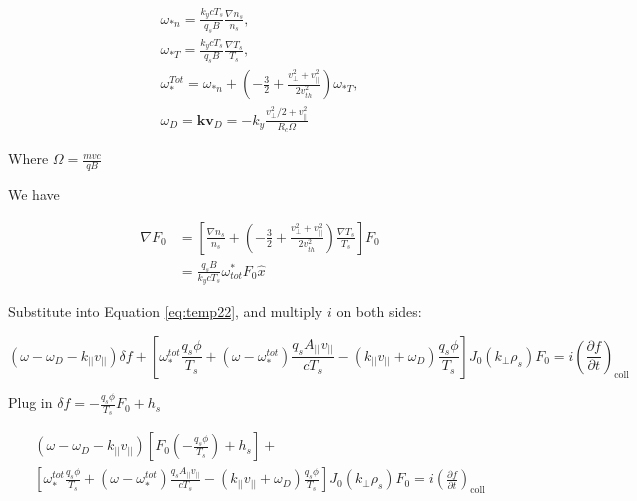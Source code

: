 \begin{eqnarray}
    \omega_{*n}=\frac{k_ycT_s}{q_sB}\frac{\nabla n_s}{n_s}, \\
    \omega_{*T}=\frac{k_ycT_s}{q_sB}\frac{\nabla T_s}{T_s}, \\
    \omega_{*}^{Tot} = \omega_{*n}+(-\frac{3}{2}+\frac{v_{\perp}^2+v_{\parallel}^2}{2v_{th}^2})\omega_{*T},\\
    \omega_D=\textbf{kv}_D=-k_{y}\frac{v_{\perp}^2/2+v_{\parallel}^2}{R_c\Omega}
\end{eqnarray}

Where $\Omega=\frac{mvc}{qB}$

We have

\begin{equation}
\begin{aligned}
    \nabla F_0&=\left[\frac{\nabla n_s}{n_s}+(-\frac{3}{2}+\frac{v_{\perp}^2+v_{\parallel}^2}{2v_{th}^2})\frac{\nabla T_s}{T_s}\right]F_0\\
    &=\frac{q_sB}{k_ycT_s}\omega^*_{tot}F_0\hat{x}
\end{aligned}
\end{equation}

Substitute into Equation \ref{eq:temp22}, and multiply $i$ on both sides:

\begin{equation}
    (\omega -\omega_D 
    - k_{||}v_{||})\delta f
    +\left[\omega_{*}^{tot}\frac{q_s\phi}{T_s}+
    (\omega -\omega^{tot}_*)\frac{q_s A_{||}v_{||}}{cT_s}-(k_{||}v_{||}+\omega_D)\frac{q_s\phi}{T_s}\right]J_0(k_\perp \rho_s)F_0
    =i\left(\frac{\partial f}{\partial t}\right)_{\mathrm{coll}}
    \label{eq:temp23}
\end{equation}


Plug in $\delta f=-\frac{q_s\phi}{T_s}F_0+h_s$

\begin{equation}
\begin{aligned}
    (\omega -\omega_D 
    - k_{||}v_{||})\left[F_0\left(-\frac{q_s\phi}{T_s} \right)+h_s\right]
    +\\
    \left[\omega_{*}^{tot}\frac{q_s\phi}{T_s}+
    (\omega-\omega^{tot}_*) \frac{q_s A_{||}v_{||}}{cT_s}-(k_{||}v_{||}+\omega_D)\frac{q_s\phi}{T_s}\right]J_0(k_\perp \rho_s)F_0
    =i\left(\frac{\partial f}{\partial t}\right)_{\mathrm{coll}}
\end{aligned}
\end{equation}

